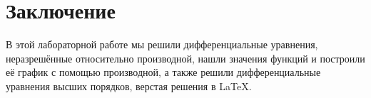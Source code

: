 \documentclass[14pt, a4paper, titlepage, fleqn]{extarticle}
\begin{document}
    \section{Заключение}
        В этой лабораторной работе мы решили дифференциальные 
        уравнения, неразрешённые относительно производной, нашли значения
        функций и построили её график с помощью производной, 
        а также решили дифференциальные уравнения высших
        порядков, верстая решения в \LaTeX.
\end{document}
